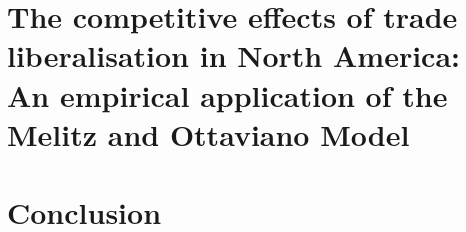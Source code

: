 \documentclass[oneside,12pt,a4paper]{Classes/CUEDthesisPSnPDF}
\begin{document}
\chapter{The competitive effects of trade liberalisation in North America: An empirical application of the Melitz and Ottaviano Model}  
 

\chapter{Conclusion} %


\begin{spacing}{1.5}


\newpage
\end{spacing}
\end{document}
